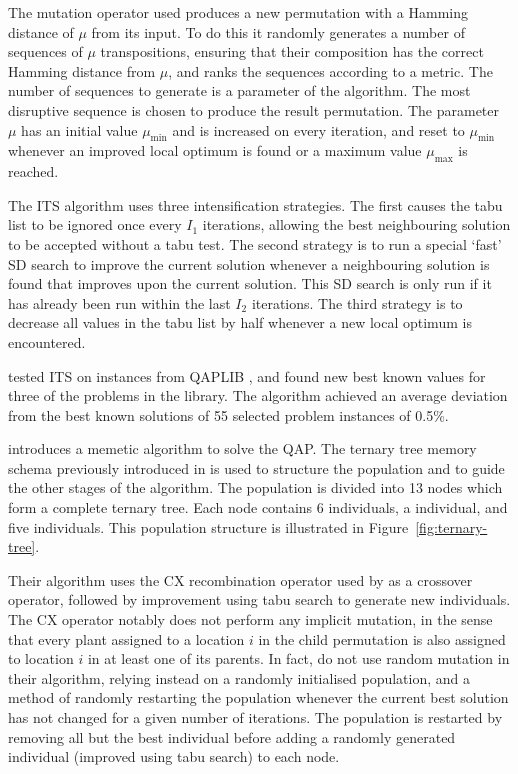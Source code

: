 {	The mutation operator used produces a new permutation with a Hamming distance of \(\mu\) from its input. To do this it randomly generates a number of sequences of \(\mu\) transpositions, ensuring that their composition has the correct Hamming distance from \(\mu\), and ranks the sequences according to a  metric. The number of sequences to generate is a parameter of the algorithm. The most disruptive sequence is chosen to produce the result permutation.
	The parameter \(\mu\) has an initial value \(\mu_\text{min}\) and is increased on every iteration, and reset to \(\mu_\text{min}\) whenever an improved local optimum is found or a maximum value \(\mu_\text{max}\) is reached.

	The ITS algorithm uses three intensification strategies.
	The first causes the tabu list to be ignored once every \(I_1\) iterations, allowing the best neighbouring solution to be accepted without a tabu test.
	The second strategy is to run a special `fast' SD search to improve the current solution whenever a neighbouring solution is found that improves upon the current solution. This SD search is only run if it has already been run within the last \(I_2\) iterations.
	The third strategy is to decrease all values in the tabu list by half whenever a new local optimum is encountered.

	\citeauthor{Misevicius:2012dj} tested ITS on instances from QAPLIB \citep{Burkard:1997ve}, and found new best known values for three of the problems in the library. The algorithm achieved an average deviation from the best known solutions of 55 selected problem instances of 0.5\%.



    \citet{Harris:2015kw} introduces a memetic algorithm to solve the QAP.
    The ternary tree memory schema previously introduced in \citet{Inostroza:2008md} is used to structure the population and to guide the other stages of the algorithm.
    The population is divided into 13 nodes which form a complete ternary tree. Each node contains 6 individuals, a  individual, and five  individuals.
    This population structure is illustrated in Figure~\ref{fig:ternary-tree}.

	Their algorithm uses the CX recombination operator used by \citet{Merz:2000ek} as a crossover operator, followed by improvement using tabu search to generate new individuals.
	The CX operator notably does not perform any implicit mutation, in the sense that every plant assigned to a location \(i\) in the child permutation is also assigned to location \(i\) in at least one of its parents.
	In fact, \citeauthor{Harris:2015kw} do not use random mutation in their algorithm, relying instead on a randomly initialised population, and a method of randomly restarting the population whenever the current best solution has not changed for a given number of iterations. The population is restarted by removing all but the best individual before adding a randomly generated individual (improved using tabu search) to each node.

}
